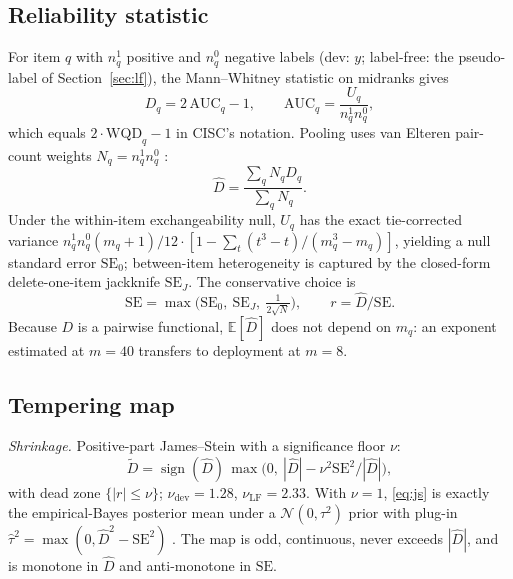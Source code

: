 \documentclass{article}
\newcommand{\Dhat}{\widehat{D}}
\newcommand{\sign}{\operatorname{sign}}
\begin{document}
\subsection{Reliability statistic}
For item $q$ with $n^1_q$ positive and $n^0_q$ negative labels (dev: $y$; label-free: the pseudo-label of Section~\ref{sec:lf}), the Mann--Whitney statistic on midranks gives
\begin{equation}
D_q = 2\,\mathrm{AUC}_q-1,\qquad \mathrm{AUC}_q=\frac{U_q}{n^1_q n^0_q},
\end{equation}
which equals $2\cdot\mathrm{WQD}_q-1$ in CISC's notation. Pooling uses van Elteren pair-count weights $N_q=n^1_q n^0_q$ \citep{vanelteren1960}:
\begin{equation}\label{eq:pooled}
\Dhat=\frac{\sum_q N_q D_q}{\sum_q N_q}.
\end{equation}
Under the within-item exchangeability null, $U_q$ has the exact tie-corrected variance $n^1_qn^0_q(m_q{+}1)/12\cdot[1-\sum_t(t^3-t)/(m_q^3-m_q)]$, yielding a null standard error $\mathrm{SE}_0$; between-item heterogeneity is captured by the closed-form delete-one-item jackknife $\mathrm{SE}_J$. The conservative choice is
\begin{equation}
\mathrm{SE}=\max\big(\mathrm{SE}_0,\ \mathrm{SE}_J,\ \tfrac{1}{2\sqrt{N}}\big),\qquad r=\Dhat/\mathrm{SE}.
\end{equation}
Because $D$ is a pairwise functional, $\mathbb{E}[\Dhat]$ does not depend on $m_q$: an exponent estimated at $m{=}40$ transfers to deployment at $m{=}8$.

\subsection{Tempering map}
\emph{Shrinkage.} Positive-part James--Stein with a significance floor $\nu$:
\begin{equation}\label{eq:js}
\tilde D=\sign(\Dhat)\,\max\!\big(0,\ |\Dhat|-\nu^2\mathrm{SE}^2/|\Dhat|\big),
\end{equation}
with dead zone $\{|r|\le\nu\}$; $\nu_{\mathrm{dev}}=1.28$, $\nu_{\mathrm{LF}}=2.33$. With $\nu=1$, \eqref{eq:js} is exactly the empirical-Bayes posterior mean under a $\mathcal{N}(0,\tau^2)$ prior with plug-in $\hat\tau^2=\max(0,\Dhat^2-\mathrm{SE}^2)$ \citep{james1961estimation}. The map is odd, continuous, never exceeds $|\Dhat|$, and is monotone in $\Dhat$ and anti-monotone in $\mathrm{SE}$.
\end{document}
